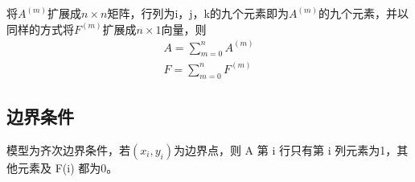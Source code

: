 \documentclass[UTF8,titlepage,twocolumn]{ctexart}
\begin{document}
将$A^{(m)}$扩展成$n \times n$矩阵，行列为i，j，k的九个元素即为$A^{(m)}$的九个元素，并以同样的方式将$F^{(m)}$扩展成$n \times 1$向量，则
$$
\begin{matrix} 
	A = \sum\limits_{m=0}^n A^{(m)} \\
	F = \sum\limits_{m=0}^n F^{(m)}
\end{matrix}
$$

\subsection{边界条件}

模型为齐次边界条件，若$(x_i,y_i)$为边界点，则 A 第 i 行只有第 i 列元素为1，其他元素及  F(i) 都为0。


%
%
\end{document}
